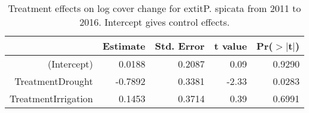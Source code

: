 \begin{table}[ht]
\centering
\caption{Treatment effects on log cover change for 	extit{P. spicata} from 2011 to 2016. Intercept gives control effects.} 
\label{table:changePSSP}
\begin{tabular}{rrrrr}
  \hline
 & Estimate & Std. Error & t value & Pr($>$$|$t$|$) \\ 
  \hline
(Intercept) & 0.0188 & 0.2087 & 0.09 & 0.9290 \\ 
  TreatmentDrought & -0.7892 & 0.3381 & -2.33 & 0.0283 \\ 
  TreatmentIrrigation & 0.1453 & 0.3714 & 0.39 & 0.6991 \\ 
   \hline
\end{tabular}
\end{table}
